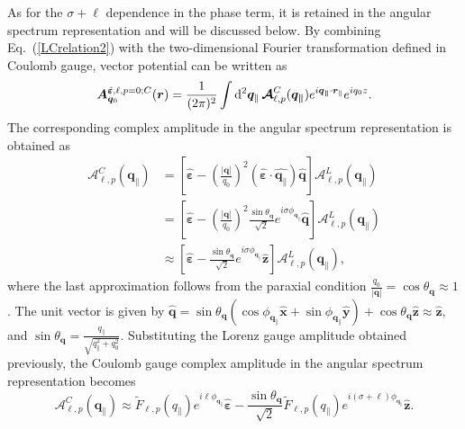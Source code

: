 %
%
%
%
As for the $\sigma+\ell$ dependence in the phase term, it is retained in the angular spectrum representation and will be discussed below. By combining Eq.~(\ref{LCrelation2}) with the two-dimensional Fourier transformation defined in Coulomb gauge, vector potential can be written as
\begin{equation}
\boldsymbol{A}^{\hat{\boldsymbol{\varepsilon}}, \ell, p=0; C}_{\boldsymbol{q}_0}(\boldsymbol{r})
=
\frac{1}{(2\pi)^2}
\int {\rm d}^2 \boldsymbol{q}_\parallel
\,
\boldsymbol{\mathcal{A}}^C_{\ell, p}(\boldsymbol{q_\parallel})
e^{i\boldsymbol{q_\parallel}\cdot \boldsymbol{r}_\parallel}
e^{iq_0 z}.
\label{planwaveinC}
\end{equation}
The corresponding complex amplitude in the angular spectrum representation is obtained as
\begin{align}
\boldsymbol{\mathcal{A}}^C_{\ell, p}(\boldsymbol{q_\parallel})
&=
\left[
\hat{\boldsymbol{\varepsilon}}
-
\left(
\frac{|\boldsymbol{q}|}{q_0}
\right)^2
(\hat{\boldsymbol{\varepsilon}}\cdot\hat{\boldsymbol{q}_\parallel})
\hat{\boldsymbol{q}}
\right]
\mathcal{A}^L_{\ell, p}(\boldsymbol{q_\parallel}) \\
&=
\left[
\hat{\boldsymbol{\varepsilon}}
-
\left(
\frac{|\boldsymbol{q}|}{q_0}
\right)^2
\frac{\sin\theta_{\boldsymbol{q}}}{\sqrt{2}}
e^{i\sigma\phi_{\boldsymbol{q}_\parallel}}
\hat{\boldsymbol{q}}
\right]
\mathcal{A}^L_{\ell, p}(\boldsymbol{q_\parallel}) \\
&\approx
\left[
\hat{\boldsymbol{\varepsilon}}
-
\frac{\sin\theta_{\boldsymbol{q}}}{\sqrt{2}}
e^{i\sigma\phi_{\boldsymbol{q}_\parallel}}
\hat{\boldsymbol{z}}
\right]
\mathcal{A}^L_{\ell, p}(\boldsymbol{q_\parallel}),
\label{approx_to_1}
\end{align}
where the last approximation follows from the paraxial condition $\frac{q_0}{|\boldsymbol{q}|}=\cos{\theta_{\boldsymbol{q}}}\approx1$. The unit vector is given by $\hat{\boldsymbol{q}}=\sin{\theta_{\boldsymbol{q}}}\left(\cos{\phi_{\boldsymbol{q}_\parallel}}\hat{\boldsymbol{x}}+\sin{\phi_{\boldsymbol{q}_\parallel}}\hat{\boldsymbol{y}}\right)+\cos{\theta_{\boldsymbol{q}}}\hat{\boldsymbol{z}}\approx\hat{\boldsymbol{z}}$, and $\sin\theta_{\boldsymbol{q}} = \frac{q_\parallel}{\sqrt{q_\parallel^2+q_0^2}}$. Substituting the Lorenz gauge amplitude obtained previously, the Coulomb gauge complex amplitude in the angular spectrum representation becomes
\begin{equation}
\boldsymbol{\mathcal{A}}^C_{\ell, p}(\boldsymbol{q_\parallel})
\approx
\tilde{F}_{\ell, p}(q_\parallel)
e^{i\ell \phi_{\boldsymbol{q}_\parallel}}
\hat{\boldsymbol{\varepsilon}}
-
\frac{\sin\theta_{\boldsymbol{q}}}{\sqrt{2}}
\tilde{F}_{\ell, p}(q_\parallel)
e^{i(\sigma+\ell)\phi_{\boldsymbol{q}_\parallel}}
\hat{\boldsymbol{z}}.
\label{AinCinQ}
\end{equation}
